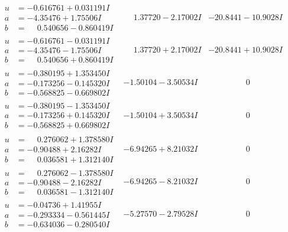 \documentclass[1p]{elsarticle_modified}
\theoremstyle{definition}
\begin{document}
$$\begin{array}{c|c|c}
\begin{aligned}
u &= -0.616761 + 0.031191 I \\
a &= -4.35476 + 1.75506 I \\
b &= \phantom{-}0.540656 - 0.860419 I\end{aligned}
 & \phantom{-}1.37720 - 2.17002 I & -20.8441 - 10.9028 I \\ \hline\begin{aligned}
u &= -0.616761 - 0.031191 I \\
a &= -4.35476 - 1.75506 I \\
b &= \phantom{-}0.540656 + 0.860419 I\end{aligned}
 & \phantom{-}1.37720 + 2.17002 I & -20.8441 + 10.9028 I \\ \hline\begin{aligned}
u &= -0.380195 + 1.353450 I \\
a &= -0.173256 - 0.145320 I \\
b &= -0.568825 - 0.669802 I\end{aligned}
 & -1.50104 - 3.50534 I & \phantom{-0.000000 } 0 \\ \hline\begin{aligned}
u &= -0.380195 - 1.353450 I \\
a &= -0.173256 + 0.145320 I \\
b &= -0.568825 + 0.669802 I\end{aligned}
 & -1.50104 + 3.50534 I & \phantom{-0.000000 } 0 \\ \hline\begin{aligned}
u &= \phantom{-}0.276062 + 1.378580 I \\
a &= -0.90488 + 2.16282 I \\
b &= \phantom{-}0.036581 + 1.312140 I\end{aligned}
 & -6.94265 + 8.21032 I & \phantom{-0.000000 } 0 \\ \hline\begin{aligned}
u &= \phantom{-}0.276062 - 1.378580 I \\
a &= -0.90488 - 2.16282 I \\
b &= \phantom{-}0.036581 - 1.312140 I\end{aligned}
 & -6.94265 - 8.21032 I & \phantom{-0.000000 } 0 \\ \hline\begin{aligned}
u &= -0.04736 + 1.41955 I \\
a &= -0.293334 - 0.561445 I \\
b &= -0.634036 - 0.280540 I\end{aligned}
 & -5.27570 - 2.79528 I & \phantom{-0.000000 } 0\\

\end{array}$$
\end{document}
